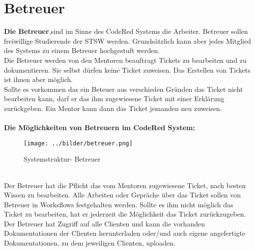 \chapter{Betreuer}  %
\label{chapter:Betreuer}  %

\textbf{Die Betreuer},sind im Sinne des CodeRed Systems die Arbeiter. Betreuer sollen freiwillige Studierende der STSW werden. Grundsätzlich kann aber jedes Mitglied des Systems zu einem Betreuer hochgestuft werden.\\
Die Betreuer werden von den Mentoren beauftragt Tickets zu bearbeiten und zu dokumentieren. Sie selbst dürfen keine Ticket zuweisen. Das Erstellen von Tickets ist ihnen aber möglich. \\
Sollte es vorkommen das ein Beteuer aus verschieden Gründen das Ticket nicht bearbeiten kann, darf er das ihm zugewiesene Ticket mit einer Erklärung zurückgeben. Ein Mentor kann dann das Ticket jemanden neu zuweisen. 
\\
\\
\textbf{Die Möglichkeiten von Betreuern im CodeRed System:}
\begin{figure}[h]
\begin{center}
   \texttt{[image: ../bilder/betreuer.png]}
   \caption{Systemstruktur- Betreuer}
   \label{Systemstruktur - Betreuer}
\end{center}
\end{figure}
\\
Der Betreuer hat die Pflicht das vom Mentoren zugewiesene Ticket, nach besten Wissen zu bearbeiten. Alle Arbeiten oder Gepräche über das Ticket sollen von Betreuer in Worksflows festgehalten werden. Sollte es ihm nicht möglich das Ticket zu bearbeiten, hat er jederzeit die Möglichkeit das Ticket zurückzugeben. Der Betreuer hat Zugriff auf alle Clienten und kann die vorhanden Dokumentationen der Clienten herunterladen oder/und auch eigene angefertigte Dokumentationen, zu dem jeweiligen Clienten, uploaden.

